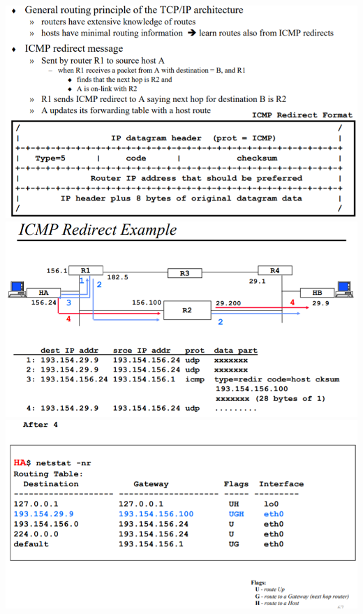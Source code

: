 \documentclass{article}
\begin{document}
\begin{center}
    \includegraphics[width=14cm]{images/RCOM32.png}
    \includegraphics[width=14cm]{images/RCOM33.png}
    \includegraphics[width=14cm]{images/RCOM34.png}
\end{center}
\end{document}

